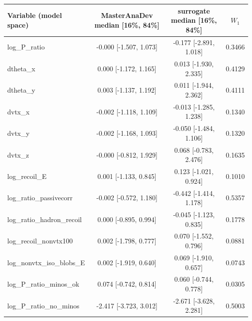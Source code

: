 \begin{tabular}{lccc}
\toprule
Variable (model space) & MasterAnaDev median [16\%, 84\%] & surrogate median [16\%, 84\%] & $W_1$ \\
\midrule
log\_P\_ratio & -0.000 [-1.507, 1.073] & -0.177 [-2.891, 1.018] & 0.3466 \\
dtheta\_x & 0.000 [-1.172, 1.165] & 0.013 [-1.930, 2.335] & 0.4129 \\
dtheta\_y & 0.003 [-1.137, 1.192] & 0.011 [-1.944, 2.362] & 0.4111 \\
dvtx\_x & -0.002 [-1.118, 1.109] & -0.013 [-1.285, 1.238] & 0.1340 \\
dvtx\_y & -0.002 [-1.168, 1.093] & -0.050 [-1.484, 1.106] & 0.1320 \\
dvtx\_z & -0.000 [-0.812, 1.929] & 0.068 [-0.783, 2.476] & 0.1635 \\
log\_recoil\_E & 0.001 [-1.133, 0.845] & 0.123 [-1.021, 0.924] & 0.1010 \\
log\_ratio\_passivecorr & -0.002 [-0.572, 1.180] & -0.442 [-1.414, 1.178] & 0.5357 \\
log\_ratio\_hadron\_recoil & 0.000 [-0.895, 0.994] & -0.045 [-1.123, 0.835] & 0.1778 \\
log\_recoil\_nonvtx100 & 0.002 [-1.798, 0.777] & 0.070 [-1.552, 0.796] & 0.0881 \\
log\_nonvtx\_iso\_blobs\_E & 0.002 [-1.919, 0.640] & 0.069 [-1.910, 0.657] & 0.0743 \\
log\_P\_ratio\_minos\_ok & 0.074 [-0.742, 0.814] & 0.060 [-0.744, 0.778] & 0.0305 \\
log\_P\_ratio\_no\_minos & -2.417 [-3.723, 3.012] & -2.671 [-3.628, 2.281] & 0.5003 \\
\bottomrule
\end{tabular}
